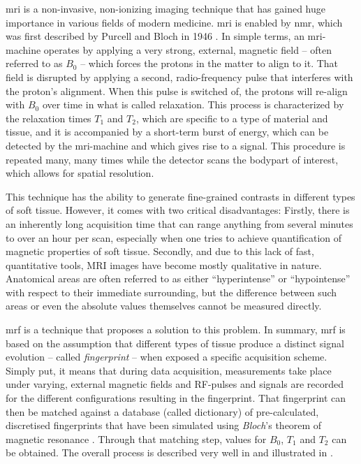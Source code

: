 \acrshort{mri} is a non-invasive, non-ionizing imaging technique that has gained huge importance in various fields of modern medicine. \acrshort{mri} is enabled by \acrfull{nmr}, which was first described by Purcell and Bloch in 1946 \cite{Bloch:1946Nuclear,Purcell:1946Resonance}. In simple terms, an \acrshort{mri}-machine operates by applying a very strong, external, magnetic field -- often referred to as $B_0$ -- which forces the protons in the matter to align to it. That field is disrupted by applying a second, radio-frequency pulse that interferes with the proton's alignment. When this pulse is switched of, the protons will re-align with $B_0$ over time in what is called relaxation. This process is characterized by the relaxation times $T_1$ and $T_2$, which are specific to a type of material and tissue, and it is accompanied by a short-term burst of energy, which can be detected by the \acrshort{mri}-machine and which gives rise to a signal. This procedure is repeated many, many times while the detector scans the bodypart of interest, which allows for spatial resolution.

This technique has the ability to generate fine-grained contrasts in different types of soft tissue. However, it comes with two critical disadvantages: Firstly, there is an inherently long acquisition time that can range anything from several minutes to over an hour per scan, especially when one tries to achieve quantification of magnetic properties of soft tissue. Secondly, and due to this lack of fast, quantitative tools, MRI images have become mostly qualitative in nature. Anatomical areas are often referred to as either ``hyperintense'' or ``hypointense'' with respect to their immediate surrounding, but the difference between such areas or even the absolute values themselves cannot be measured directly.

\acrfull{mrf} is a technique \cite{Ma:2013Magnetic} that proposes a solution to this problem. In summary, \acrshort{mrf} is based on the assumption that different types of tissue produce a distinct signal evolution -- called \emph{fingerprint} -- when exposed a specific acquisition scheme. Simply put, it means that during data acquisition, measurements take place under varying, external magnetic fields and RF-pulses and signals are recorded for the different configurations resulting in the fingerprint. That fingerprint can then be matched against a database (called dictionary) of pre-calculated, discretised fingerprints that have been simulated using \emph{Bloch}'s theorem of magnetic resonance \cite{Bloch:1946Nuclear}. Through that matching step, values for $B_0$, $T_1$ and $T_2$ can be obtained. The overall process is described very well in \cite{Bipin:2019Magnetic} and illustrated in .

